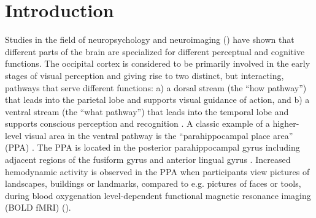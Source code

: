 \documentclass[english,11pt]{article}
\begin{document}

\pagebreak[4]


\section*{Introduction}


Studies in the field of neuropsychology and neuroimaging
(\citep[e.g.,][]{penfield1950cerebral, fox1984noninvasive}) have shown that
different parts of the brain are specialized for different perceptual and
cognitive functions.
The occipital cortex is considered to be primarily involved in the early stages
of visual perception and giving rise to two distinct, but interacting, pathways
that serve different functions:
a) a dorsal stream (the ``how pathway'') that leads into the parietal lobe and
supports visual guidance of action, and b) a ventral stream (the ``what
pathway'') that leads into the temporal lobe and supports conscious perception
and recognition \citep{goodale1992separate, milner2017two, ungerleider1982two}.
A classic example of a higher-level visual area in the ventral pathway is the
``parahippocampal place area'' (PPA) \citep{epstein1998ppa,
epstein1999parahippocampal}.
The PPA is located in the posterior parahippocampal gyrus including adjacent
regions of the fusiform gyrus and anterior lingual gyrus
\citep{epstein2008parahippocampal}.
Increased hemodynamic activity is observed in the PPA when participants view
pictures of landscapes, buildings or landmarks, compared to e.g. pictures of
faces or tools, during blood oxygenation level-dependent functional magnetic
resonance imaging (BOLD fMRI) (\citep[see reviews][]{epstein2014neural,
aminoff2013role}).
\end{document}
